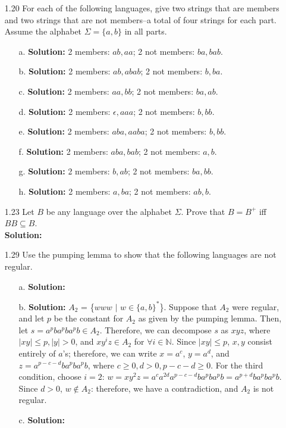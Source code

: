 \begin{enumerate}
\item[1.20]For each of the following languages, give two strings that are members and two strings that are not members--a total of four strings for each part. Assume the alphabet $\Sigma = \{a,b\}$ in all parts.
\begin{enumerate}
\item[a.]\textbf{Solution:} 2 members: $ab, aa$; 2 not members: $ba, bab$.
\item[b.]\textbf{Solution:} 2 members: $ab, abab$; 2 not members: $b, ba$.
\item[c.]\textbf{Solution:} 2 members: $aa, bb$; 2 not members: $ba, ab$.
\item[d.]\textbf{Solution:} 2 members: $\epsilon, aaa$; 2 not members: $b, bb$.
\item[e.]\textbf{Solution:} 2 members: $aba, aaba$; 2 not members: $b, bb$.
\item[f.]\textbf{Solution:} 2 members: $aba, bab$; 2 not members: $a, b$.
\item[g.]\textbf{Solution:} 2 members: $b, ab$; 2 not members: $ba, bb$.
\item[h.]\textbf{Solution:} 2 members: $a, ba$; 2 not members: $ab, b$.
\end{enumerate}

\item[1.23]Let $B$ be any language over the alphabet $\Sigma$. Prove that $B = B^+$ iff $BB \subseteq B$.
\\
\textbf{Solution:} \alreadyanswered

\item[1.29]Use the pumping lemma to show that the following languages are not regular.
\begin{enumerate}
\item[a.]\textbf{Solution:} \alreadyanswered
\item[b.]\textbf{Solution:} $A_2$ = \{$www$ $|$ $w \in \{a, b\}^*$\}. Suppose that $A_2$ were regular, and let $p$ be the constant for $A_2$ as given by the pumping lemma. Then, let $s = a^{p}ba^{p}ba^{p}b \in A_2$. Therefore, we can decompose $s$ as $xyz$, where $|xy| \le p, |y| > 0$, and $xy^iz \in A_2$ for $\forall i \in \mathbb{N}$. Since $|xy| \le p$, $x, y$ consist entirely of $a$'s; therefore, we can write $x = a^c$, $y = a^d$, and $z = a^{p-c-d}ba^{p}ba^{p}b$, where $c \ge 0, d > 0, p-c-d \ge 0$. For the third condition, choose $i = 2$: $w = xy^{2}z = a^{c}a^{2d}a^{p-c-d}ba^{p}ba^{p}b = a^{p+d}ba^{p}ba^{p}b$. Since $d > 0$, $w \notin A_2$: therefore, we have a contradiction, and $A_2$ is not regular.
\item[c.]\textbf{Solution:} \alreadyanswered
\end{enumerate}


\end{enumerate}
